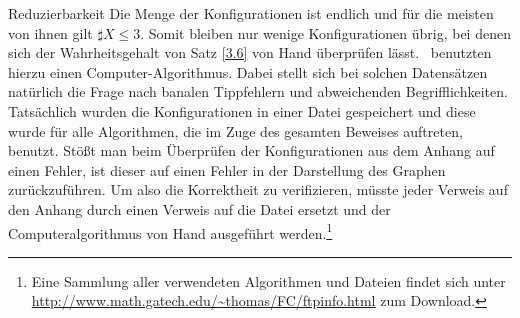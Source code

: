 \begin{section}{Reduzierbarkeit}
 Die Menge der Konfigurationen ist endlich und für die meisten von ihnen gilt $\sharp X \leq 3$. Somit bleiben nur wenige Konfigurationen übrig, bei denen sich der Wahrheitsgehalt von Satz \ref{3.6} von Hand überprüfen lässt. \rsst \-\ benutzten hierzu einen Computer-Algorithmus. Dabei stellt sich bei solchen Datensätzen natürlich die Frage nach banalen Tippfehlern und abweichenden Begrifflichkeiten. Tatsächlich wurden die Konfigurationen in einer Datei gespeichert und diese wurde für alle Algorithmen, die im Zuge des gesamten Beweises auftreten, benutzt. Stößt man beim Überprüfen der Konfigurationen aus dem Anhang auf einen Fehler, ist dieser auf einen Fehler in der Darstellung des Graphen zurückzuführen. Um also die Korrektheit zu verifizieren, müsste jeder Verweis auf den Anhang durch einen Verweis auf die Datei ersetzt und der Computeralgorithmus von Hand ausgeführt werden.\footnote{Eine Sammlung aller verwendeten Algorithmen und Dateien findet sich unter \url{http://www.math.gatech.edu/~thomas/FC/ftpinfo.html} zum Download.}
 

\end{section}
